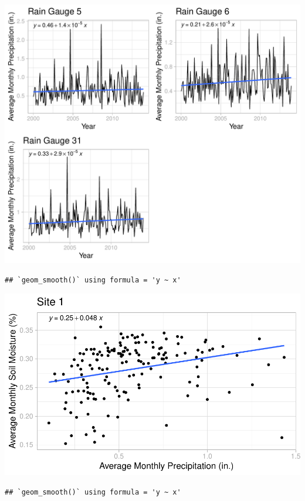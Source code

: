 \documentclass[
  12pt,
]{article}
\begin{document}
\includegraphics{Project_Template_files/figure-latex/Average Monthly Precipitation Cowplot-1.pdf}

\begin{verbatim}
## `geom_smooth()` using formula = 'y ~ x'
\end{verbatim}

\includegraphics{Project_Template_files/figure-latex/Average Monthly Soil Moisture and Precipitation Plots-1.pdf}

\begin{verbatim}
## `geom_smooth()` using formula = 'y ~ x'
\end{verbatim}
\end{document}
